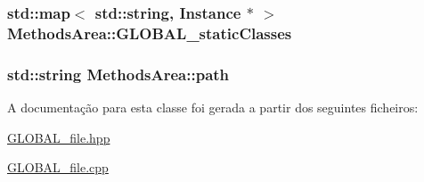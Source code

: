 \subsubsection[{\texorpdfstring{G\+L\+O\+B\+A\+L\+\_\+static\+Classes}{GLOBAL_staticClasses}}]{\setlength{\rightskip}{0pt plus 5cm}std\+::map$<$ std\+::string, {\bf Instance} $\ast$ $>$ Methods\+Area\+::\+G\+L\+O\+B\+A\+L\+\_\+static\+Classes\hspace{0.3cm}{\ttfamily [static]}}\hypertarget{class_methods_area_a34d779cc67f370a08cedc65245af2e7e}{}\label{class_methods_area_a34d779cc67f370a08cedc65245af2e7e}
\subsubsection[{\texorpdfstring{path}{path}}]{\setlength{\rightskip}{0pt plus 5cm}std\+::string Methods\+Area\+::path\hspace{0.3cm}{\ttfamily [static]}}\hypertarget{class_methods_area_af7210f4ca8ad442f7f9b83baa750b015}{}\label{class_methods_area_af7210f4ca8ad442f7f9b83baa750b015}


A documentação para esta classe foi gerada a partir dos seguintes ficheiros\+:\begin{DoxyCompactItemize}
\item 
\hyperlink{_g_l_o_b_a_l__file_8hpp}{G\+L\+O\+B\+A\+L\+\_\+file.\+hpp}\item 
\hyperlink{_g_l_o_b_a_l__file_8cpp}{G\+L\+O\+B\+A\+L\+\_\+file.\+cpp}\end{DoxyCompactItemize}
